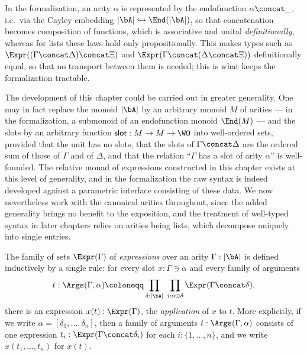 \begin{remark}
    In the formalization, an arity $\alpha$ is represented by the endofunction $\alpha \concat \_$, i.e.\ via the Cayley embedding $\left|\bA\right| \hookrightarrow \End(\left|\bA\right|)$, so that concatenation becomes composition of functions, which is associative and unital \emph{definitionally}, whereas for lists these laws hold only propositionally. This makes types such as $\Expr((\Gamma \concat \Delta) \concat \Xi)$ and $\Expr(\Gamma \concat (\Delta \concat \Xi))$ definitionally equal, so that no transport between them is needed; this is what keeps the formalization tractable.
\end{remark}

\begin{remark}
    The development of this chapter could be carried out in greater generality. One may in fact replace the monoid $\left|\bA\right|$ by an arbitrary monoid $M$ of arities --- in the formalization, a submonoid of an endofunction monoid $\End(M)$ --- and the slots by an arbitrary function $\mathsf{slot} : M \to M \to \WO$ into well-ordered sets, provided that the unit has no slots, that the slots of $\Gamma \concat \Delta$ are the ordered sum of those of $\Gamma$ and of $\Delta$, and that the relation ``$\Gamma$ has a slot of arity $\alpha$'' is well-founded. The relative monad of expressions constructed in this chapter exists at this level of generality, and in the formalization the raw syntax is indeed developed against a parametric interface consisting of these data. We now nevertheless work with the canonical arities throughout, since the added generality brings no benefit to the exposition, and the treatment of well-typed syntax in later chapters relies on arities being lists, which decompose uniquely into single entries.
\end{remark}

\begin{definition}\label{def:expressions}
    The family of sets $\Expr(\Gamma)$ of \emph{expressions} over an arity $\Gamma : \left|\bA\right|$ is defined inductively by a single rule: for every slot $x : \Gamma \ni \alpha$ and every family of arguments
    \[
    t : \Args(\Gamma, \alpha) \coloneqq \prod_{\delta : \left|\bA\right|} \; \prod_{i : \alpha \ni \delta} \Expr(\Gamma \concat \delta),
    \]
    there is an expression $x(t) : \Expr(\Gamma)$, the \emph{application} of $x$ to $t$. More explicitly, if we write $\alpha = [\delta_1, \ldots, \delta_n]$, then a family of arguments $t : \Args(\Gamma, \alpha)$ consists of one expression $t_i : \Expr(\Gamma \concat \delta_i)$ for each $i : \{1, \ldots, n\}$, and we write $x(t_1, \ldots, t_n)$ for $x(t)$.
\end{definition}

